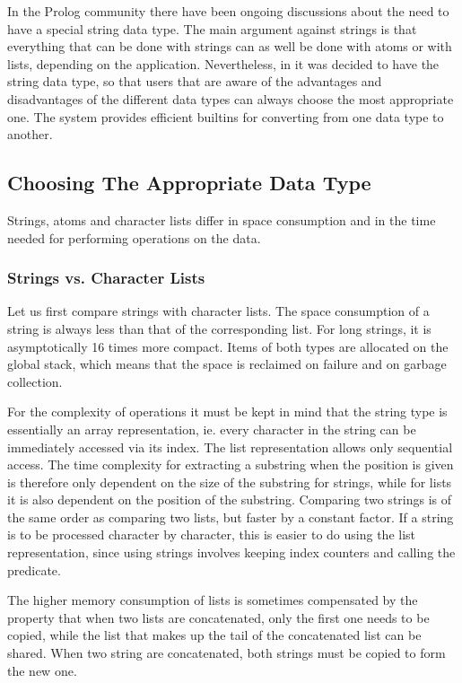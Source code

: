 In the Prolog community there have been ongoing discussions about the need
to have a special string data type.
The main argument against strings is that everything that can be done
with strings can as well be done with atoms or with lists, depending
on the application.
Nevertheless, in {\eclipse} it was decided to have the string data type, so that
users that are aware of the advantages and disadvantages of the
different data types can always choose the most appropriate one.
The system provides efficient builtins for converting from one data
type to another.

\subsection{Choosing The Appropriate Data Type}
Strings, atoms and character lists differ in space consumption and in
the time needed for performing operations on the data.

\subsubsection{Strings vs. Character Lists}
Let us first compare strings with character lists.
The space consumption of a string is always less than that of the corresponding
list. For long strings, it is asymptotically 16 times more compact.
Items of both types are allocated on the global stack, which means that
the space is reclaimed on failure and on garbage collection.

For the complexity of operations it must be kept in mind that the string type
is essentially an array representation, ie. every character in the string
can be immediately accessed via its index.
The list representation allows only sequential access.
The time complexity for extracting a substring when the position is given
is therefore only dependent on the size of the substring for strings,
while for lists it is also dependent on the position of the substring.
Comparing two strings is of the same order as comparing two lists, but
faster by a constant factor.
If a string is to be processed character by character, this is easier to
do using the list representation, since using strings involves keeping
index counters and calling the  predicate.

The higher memory consumption of lists is sometimes compensated by the
property that when two lists are concatenated, only the first one needs
to be copied, while the list that makes up the tail of the concatenated
list can be shared.
When two string are concatenated, both strings must be copied to form
the new one.

